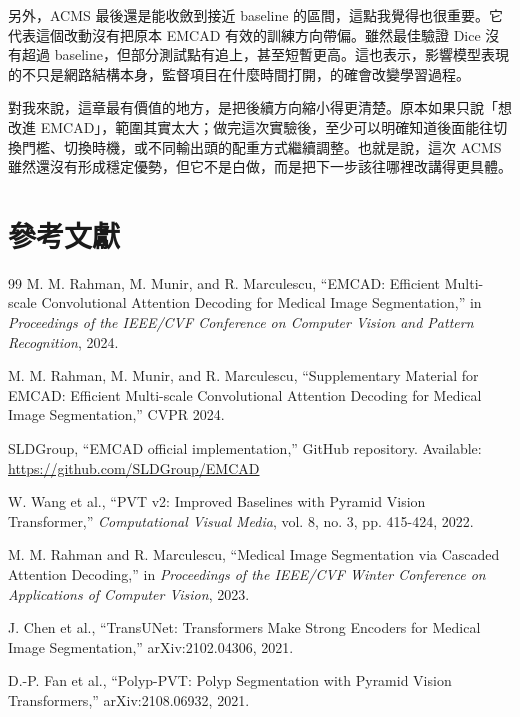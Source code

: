 \documentclass[a4paper,12pt,twocolumn]{article}
\begin{document}
另外，ACMS 最後還是能收斂到接近 baseline 的區間，這點我覺得也很重要。它代表這個改動沒有把原本 EMCAD 有效的訓練方向帶偏。雖然最佳驗證 Dice 沒有超過 baseline，但部分測試點有追上，甚至短暫更高。這也表示，影響模型表現的不只是網路結構本身，監督項目在什麼時間打開，的確會改變學習過程。

對我來說，這章最有價值的地方，是把後續方向縮小得更清楚。原本如果只說「想改進 EMCAD」，範圍其實太大；做完這次實驗後，至少可以明確知道後面能往切換門檻、切換時機，或不同輸出頭的配重方式繼續調整。也就是說，這次 ACMS 雖然還沒有形成穩定優勢，但它不是白做，而是把下一步該往哪裡改講得更具體。

\clearpage
\section*{參考文獻}
\begin{thebibliography}{99}
M. M. Rahman, M. Munir, and R. Marculescu, ``EMCAD: Efficient Multi-scale Convolutional Attention Decoding for Medical Image Segmentation,'' in \textit{Proceedings of the IEEE/CVF Conference on Computer Vision and Pattern Recognition}, 2024.

M. M. Rahman, M. Munir, and R. Marculescu, ``Supplementary Material for EMCAD: Efficient Multi-scale Convolutional Attention Decoding for Medical Image Segmentation,'' CVPR 2024.

SLDGroup, ``EMCAD official implementation,'' GitHub repository. Available: \url{https://github.com/SLDGroup/EMCAD}

W. Wang et al., ``PVT v2: Improved Baselines with Pyramid Vision Transformer,'' \textit{Computational Visual Media}, vol. 8, no. 3, pp. 415-424, 2022.

M. M. Rahman and R. Marculescu, ``Medical Image Segmentation via Cascaded Attention Decoding,'' in \textit{Proceedings of the IEEE/CVF Winter Conference on Applications of Computer Vision}, 2023.

J. Chen et al., ``TransUNet: Transformers Make Strong Encoders for Medical Image Segmentation,'' arXiv:2102.04306, 2021.

D.-P. Fan et al., ``Polyp-PVT: Polyp Segmentation with Pyramid Vision Transformers,'' arXiv:2108.06932, 2021.
\end{thebibliography}
\end{document}
